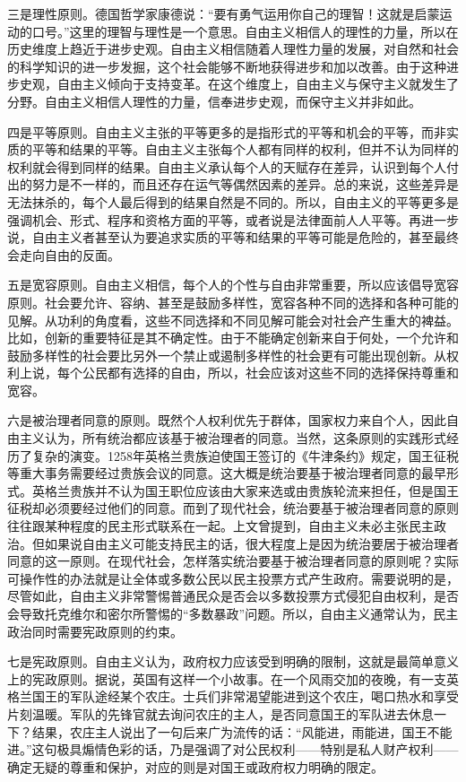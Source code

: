 三是理性原则。德国哲学家康德说：“要有勇气运用你自己的理智！这就是启蒙运动的口号。”这里的理智与理性是一个意思。自由主义相信人的理性的力量，所以在历史维度上趋近于进步史观。自由主义相信随着人理性力量的发展，对自然和社会的科学知识的进一步发掘，这个社会能够不断地获得进步和加以改善。由于这种进步史观，自由主义倾向于支持变革。在这个维度上，自由主义与保守主义就发生了分野。自由主义相信人理性的力量，信奉进步史观，而保守主义并非如此。

四是平等原则。自由主义主张的平等更多的是指形式的平等和机会的平等，而非实质的平等和结果的平等。自由主义主张每个人都有同样的权利，但并不认为同样的权利就会得到同样的结果。自由主义承认每个人的天赋存在差异，认识到每个人付出的努力是不一样的，而且还存在运气等偶然因素的差异。总的来说，这些差异是无法抹杀的，每个人最后得到的结果自然是不同的。所以，自由主义的平等更多是强调机会、形式、程序和资格方面的平等，或者说是法律面前人人平等。再进一步说，自由主义者甚至认为要追求实质的平等和结果的平等可能是危险的，甚至最终会走向自由的反面。

五是宽容原则。自由主义相信，每个人的个性与自由非常重要，所以应该倡导宽容原则。社会要允许、容纳、甚至是鼓励多样性，宽容各种不同的选择和各种可能的见解。从功利的角度看，这些不同选择和不同见解可能会对社会产生重大的裨益。比如，创新的重要特征是其不确定性。由于不能确定创新来自于何处，一个允许和鼓励多样性的社会要比另外一个禁止或遏制多样性的社会更有可能出现创新。从权利上说，每个公民都有选择的自由，所以，社会应该对这些不同的选择保持尊重和宽容。

六是被治理者同意的原则。既然个人权利优先于群体，国家权力来自个人，因此自由主义认为，所有统治都应该基于被治理者的同意。当然，这条原则的实践形式经历了复杂的演变。1258年英格兰贵族迫使国王签订的《牛津条约》规定，国王征税等重大事务需要经过贵族会议的同意。这大概是统治要基于被治理者同意的最早形式。英格兰贵族并不认为国王职位应该由大家来选或由贵族轮流来担任，但是国王征税却必须要经过他们的同意。而到了现代社会，统治要基于被治理者同意的原则往往跟某种程度的民主形式联系在一起。上文曾提到，自由主义未必主张民主政治。但如果说自由主义可能支持民主的话，很大程度上是因为统治要居于被治理者同意的这一原则。在现代社会，怎样落实统治要基于被治理者同意的原则呢？实际可操作性的办法就是让全体或多数公民以民主投票方式产生政府。需要说明的是，尽管如此，自由主义非常警惕普通民众是否会以多数投票方式侵犯自由权利，是否会导致托克维尔和密尔所警惕的“多数暴政”问题。所以，自由主义通常认为，民主政治同时需要宪政原则的约束。

七是宪政原则。自由主义认为，政府权力应该受到明确的限制，这就是最简单意义上的宪政原则。据说，英国有这样一个小故事。在一个风雨交加的夜晚，有一支英格兰国王的军队途经某个农庄。士兵们非常渴望能进到这个农庄，喝口热水和享受片刻温暖。军队的先锋官就去询问农庄的主人，是否同意国王的军队进去休息一下？结果，农庄主人说出了一句后来广为流传的话：“风能进，雨能进，国王不能进。”这句极具煽情色彩的话，乃是强调了对公民权利——特别是私人财产权利——确定无疑的尊重和保护，对应的则是对国王或政府权力明确的限定。

